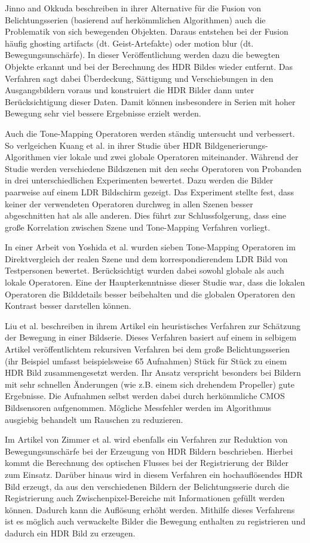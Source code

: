 Jinno and Okkuda \cite{Jinno} beschreiben in ihrer Alternative für die Fusion von Belichtungsserien (basierend auf herkömmlichen Algorithmen) auch die Problematik von sich bewegenden Objekten. Daraus entstehen bei der Fusion häufig ghosting artifacts (dt. Geist-Artefakte) oder motion blur (dt. Bewegungsunschärfe). In dieser Veröffentlichung werden dazu die bewegten Objekte erkannt und bei der Berechnung des HDR Bildes wieder entfernt. Das Verfahren sagt dabei Überdeckung, Sättigung und Verschiebungen in den Ausgangsbildern voraus und konstruiert die HDR Bilder dann unter Berücksichtigung dieser Daten. Damit können insbesondere in Serien mit hoher Bewegung sehr viel bessere Ergebnisse erzielt werden.

Auch die \gls{Tone-Mapping} Operatoren werden ständig untersucht und verbessert. So verlgeichen Kuang et al. \cite{tone_mapper_2} in ihrer Studie über \gls{HDR} Bildgenerierungs-Algorithmen vier lokale und zwei globale Operatoren miteinander. Während der Studie werden verschiedene Bildszenen mit den sechs Operatoren von Probanden in drei unterschiedlichen Experimenten bewertet. Dazu werden die Bilder paarweise auf einem \gls{LDR} Bildschirm gezeigt. Das Experiment stellte fest, dass keiner der verwendeten Operatoren durchweg in allen Szenen besser abgeschnitten hat als alle anderen. Dies führt zur Schlussfolgerung, dass eine große Korrelation zwischen Szene und \gls{Tone-Mapping} Verfahren vorliegt. 

In einer Arbeit von Yoshida et al. \cite{tone_mapper_1} wurden sieben \gls{Tone-Mapping} Operatoren im Direktvergleich der realen Szene und dem korrespondierendem \gls{LDR} Bild von Testpersonen bewertet. Berücksichtigt wurden dabei sowohl globale als auch lokale Operatoren. Eine der Haupterkenntnisse dieser Studie war, dass die lokalen Operatoren die Bilddetails besser beibehalten und die globalen Operatoren den Kontrast besser darstellen können.

Liu et al. \cite{Xinqiao} beschreiben in ihrem Artikel ein heuristisches Verfahren zur Schätzung der Bewegung in einer Bildserie. Dieses Verfahren basiert auf einem in selbigem Artikel veröffentlichtem rekursiven Verfahren bei dem große Belichtungsserien (ihr Beispiel umfasst beispielsweise 65 Aufnahmen) Stück für Stück zu einem \gls{HDR} Bild zusammengesetzt werden. Ihr Ansatz verspricht besonders bei Bildern mit sehr schnellen Änderungen (wie z.B. einem sich drehendem Propeller) gute Ergebnisse. Die Aufnahmen selbst werden dabei durch herkömmliche \gls{CMOS} Bildsensoren aufgenommen. Mögliche Messfehler werden im Algorithmus ausgiebig behandelt um Rauschen zu reduzieren.

Im Artikel von Zimmer et al. \cite{zimmer} wird ebenfalls ein Verfahren zur Reduktion von Bewegungsunschärfe bei der Erzeugung von \gls{HDR} Bildern beschrieben. Hierbei kommt die Berechnung des optischen Flusses bei der Registrierung der Bilder zum Einsatz. Darüber hinaus wird in diesem Verfahren ein hochauflösendes \gls{HDR} Bild erzeugt, da aus den verschiedenen Bildern der Belichtungsserie durch die Registrierung auch Zwischenpixel-Bereiche mit Informationen gefüllt werden können. Dadurch kann die Auflösung erhöht werden. Mithilfe dieses Verfahrens ist es möglich auch verwackelte Bilder die Bewegung enthalten zu registrieren und dadurch ein \gls{HDR} Bild zu erzeugen.